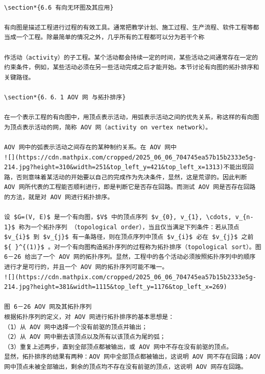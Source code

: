 \documentclass[10pt]{article}
\begin{document}
\begin{verbatim}

\section*{6.6 有向无环图及其应用}

有向图是描述工程进行过程的有效工具。通常把教学计划、施工过程、生产流程、软件工程等都当成一个工程。除最简单的情况之外，几乎所有的工程都可以分为若干个称

作活动（activity）的子工程。某个活动都会持续一定的时间，某些活动之间通常存在一定的约束条件，例如，某些活动必须在另一些活动完成之后才能开始。本节讨论有向图的拓扑排序和关键路径。

\section*{6．6．1 AOV 网 与拓扑排序}

在一个表示工程的有向图中，用顶点表示活动，用弧表示活动之间的优先关系，称这样的有向图为顶点表示活动的网，简称 AOV 网（activity on vertex network）。

AOV 网中的弧表示活动之间存在的某种制约关系。在 AOV 网中
![](https://cdn.mathpix.com/cropped/2025_06_06_704745ea57b15b2333e5g-214.jpg?height=310&width=251&top_left_y=421&top_left_x=1313)不能出现回路，否则意味着某活动的开始要以自己的完成作为先决条件，显然，这是荒谬的。因此判断 AOV 网所代表的工程能否顺利进行，即是判断它是否存在回路。而测试 AOV 网是否存在回路的方法，就是对 AOV 网进行拓扑排序。

设 $G=(V, E)$ 是一个有向图，$V$ 中的顶点序列 $v_{0}, v_{1}, \cdots, v_{n-1}$ 称为一个拓扑序列 （topological order），当且仅当满足下列条件：若从顶点 $v_{i}$ 到 $v_{j}$ 有一条路径，则在顶点序列中顶点 $v_{i}$ 必在 $v_{j}$ 之前 ${ }^{(1)}$ 。对一个有向图构造拓扑序列的过程称为拓扑排序（topological sort）。图 6－26 给出了一个 AOV 网的拓扑序列。显然，工程中的各个活动必须按照拓扑序列中的顺序进行才是可行的，并且一个 AOV 网的拓扑序列可能不唯一。
![](https://cdn.mathpix.com/cropped/2025_06_06_704745ea57b15b2333e5g-214.jpg?height=381&width=1115&top_left_y=1176&top_left_x=269)

图 6－26 AOV 网及其拓扑序列
根据拓扑序列的定义，对 AOV 网进行拓扑排序的基本思想是：
（1）从 AOV 网中选择一个没有前驱的顶点并输出；
（2）从 AOV 网中删去该顶点以及所有以该顶点为尾的弧；
（3）重复上述两步，直到全部顶点都被输出，或 AOV 网中不存在没有前驱的顶点。
显然，拓扑排序的结果有两种：AOV 网中全部顶点都被输出，这说明 AOV 网不存在回路；AOV 网中顶点未被全部输出，剩余的顶点均不存在没有前驱的顶点，这说明 AOV 网存在回路。


\end{verbatim}
\end{document}
